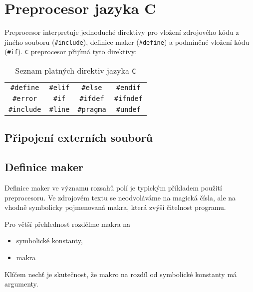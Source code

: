   \section{Preprocesor jazyka C}
    Preprocesor interpretuje jednoduché direktivy pro vložení zdrojového kódu z jiného souboru 
    (\lstinline[basicstyle=\ttfamily]!#include!), definice maker 
    (\lstinline[basicstyle=\ttfamily]!#define!) a podmíněné vložení kódu 
    (\lstinline[basicstyle=\ttfamily]!#if!). \texttt{C} preprocesor přijímá tyto direktivy:
    
    \begin{table}[ht!]
      \centering
      \begin{tabular}{c c c c}
        \hline
        \lstinline[basicstyle=\ttfamily]!#define!  & \lstinline[basicstyle=\ttfamily]!#elif! & 
        \lstinline[basicstyle=\ttfamily]!#else!    & \lstinline[basicstyle=\ttfamily]!#endif!  \\
        \lstinline[basicstyle=\ttfamily]!#error!   & \lstinline[basicstyle=\ttfamily]!#if! & 
        \lstinline[basicstyle=\ttfamily]!#ifdef!   & \lstinline[basicstyle=\ttfamily]!#ifndef! \\
        \lstinline[basicstyle=\ttfamily]!#include! & \lstinline[basicstyle=\ttfamily]!#line! & 
        \lstinline[basicstyle=\ttfamily]!#pragma!  & \lstinline[basicstyle=\ttfamily]!#undef!  \\
        \hline            
      \end{tabular}
      \caption{Seznam platných direktiv jazyka \texttt{C}}\label{S4101C1:C_tab_direktiva}
    \end{table} 
    
    \subsection{Připojení externích souborů}
    
    \subsection{Definice maker}
      Definice maker ve významu rozsahů polí je typickým příkladem použití preprocesoru. Ve 
      zdrojovém textu se neodvoláváme na magická čísla, ale na vhodně symbolicky pojmenovaná makra, 
      která zvýší čitelnost programu.
      
      Pro větší přehlednost rozdělme makra na 
      \begin{itemize}
       \item symbolické konstanty,
       \item makra
      \end{itemize}
      Klíčem nechť je skutečnost, že makro na rozdíl od symbolické konstanty má argumenty.
